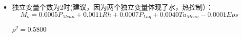 \documentclass{article}
\begin{document}
\begin{CJK}{UTF8}{gkai}
\begin{itemize}
\begin{itemize}
\item 独立变量个数为2时(建议，因为两个独立变量体现了水，热控制）：
\begin{equation*}
M_o=0.0005P_{Mean}+0.0011Rh+0.0007P_{Lag}+0.0040Ta_{Mean}-0.0001Eps
\end{equation*}
\begin{center}
$\rho^2=0.5800$
\end{center}

\end{itemize}

\end{itemize}


\end{CJK} 
\end{document}
